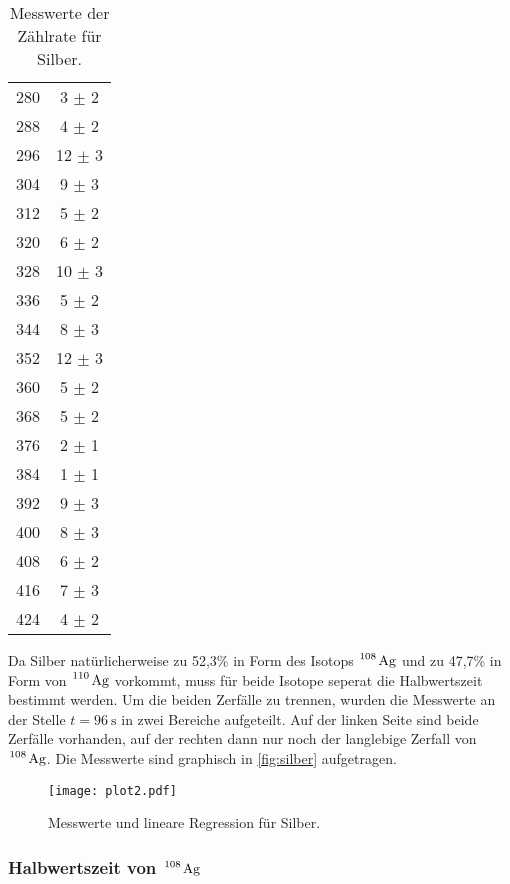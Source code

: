 \begin{table}[H]
\begin{tabular}{c c}
    280  &  3  $ \pm $  2  \\
    288  &  4  $ \pm $  2  \\
    296  &  12  $ \pm $  3  \\
    304  &  9  $ \pm $  3  \\
    312  &  5  $ \pm $  2  \\
    320  &  6  $ \pm $  2  \\
    328  &  10  $ \pm $  3  \\
    336  &  5  $ \pm $  2  \\
    344  &  8  $ \pm $  3  \\
    352  &  12  $ \pm $  3  \\
    360  &  5  $ \pm $  2  \\
    368  &  5  $ \pm $  2  \\
    376  &  2  $ \pm $  1  \\
    384  &  1  $ \pm $  1  \\
    392  &  9  $ \pm $  3  \\
    400  &  8  $ \pm $  3  \\
    408  &  6  $ \pm $  2  \\
    416  &  7  $ \pm $  3  \\
    424  &  4  $ \pm $  2  \\
    \bottomrule
  \end{tabular}
  \caption{Messwerte der Zählrate für Silber.}
  \label{tab:silber}
\end{table}

Da Silber natürlicherweise zu 52,3\% in Form des Isotops $\ce{^108 Ag}$ und zu 47,7\% in Form von $\ce{^110 Ag}$ vorkommt,
muss für beide Isotope seperat die Halbwertszeit bestimmt werden. Um die beiden Zerfälle zu trennen, wurden die Messwerte an der Stelle $t = \SI{96}{\second}$
in zwei Bereiche aufgeteilt. Auf der linken Seite sind beide Zerfälle vorhanden, auf der rechten dann nur noch der langlebige Zerfall von $\ce{^108 Ag}$.
Die Messwerte sind graphisch in \autoref{fig:silber} aufgetragen.

\begin{figure}[H]
  \centering
  \texttt{[image: plot2.pdf]}
  \caption{Messwerte und lineare Regression für Silber.}
  \label{fig:silber}
\end{figure}



\subsubsection{Halbwertszeit von $\ce{^108 Ag}$}

